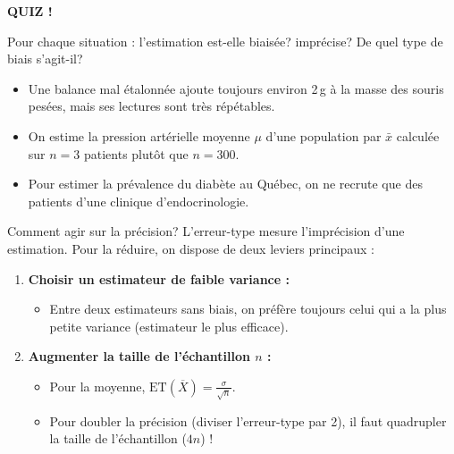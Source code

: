 \documentclass{BeamerTemplate}
\begin{document}
\begin{frame}[plain,t]
  \centerline{\LARGE\bfseries\alert{QUIZ !}}

  \medskip
  Pour chaque situation : l'estimation est-elle biaisée? imprécise? De quel type de biais s'agit-il?
  \begin{itemize}\itemsep 4mm
    \item Une balance mal étalonnée ajoute toujours environ 2\,g à la masse des souris pesées, mais ses lectures sont très répétables.\\
    \item On estime la pression artérielle moyenne $\mu$ d'une population par $\bar{x}$ calculée sur $n = 3$ patients plutôt que $n = 300$.\\
    \item Pour estimer la prévalence du diabète au Québec, on ne recrute que des patients d'une clinique d'endocrinologie.\\
  \end{itemize}
\end{frame}

\begin{frame}[t]{Comment agir sur la précision?}
  L'erreur-type mesure l'imprécision d'une estimation. Pour la réduire, on dispose de deux leviers principaux :

  \bigskip
  \begin{enumerate}\itemsep 5mm
    \item \textbf{Choisir un estimateur de faible variance :}
      \begin{itemize}
        \item Entre deux estimateurs sans biais, on préfère toujours celui qui a la plus petite variance (estimateur le plus efficace).
      \end{itemize}

    \item \textbf{Augmenter la taille de l'échantillon $n$ :}
      \begin{itemize}
        \item Pour la moyenne, $\text{ET}(\overline{X}) = \frac{\sigma}{\sqrt{n}}$.
        \item Pour \alert{doubler la précision} (diviser l'erreur-type par 2), il faut \alert{quadrupler} la taille de l'échantillon ($4n$) !
      \end{itemize}
  \end{enumerate}
\end{frame}
\end{document}
